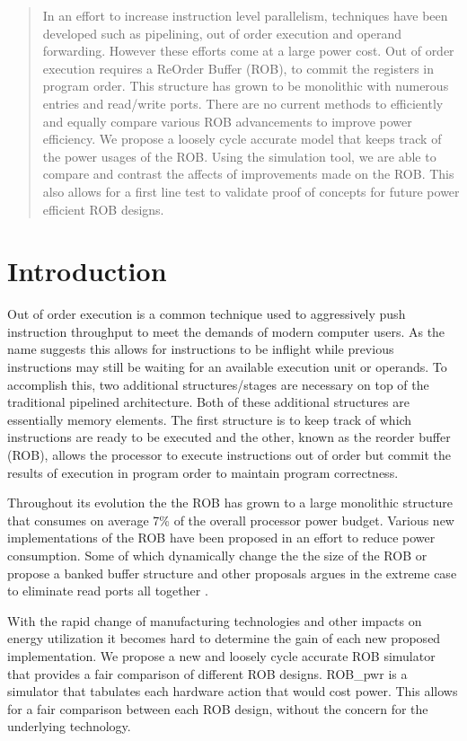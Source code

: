 \begin{abstract}
        In an effort to increase instruction level parallelism, techniques have been developed such
as pipelining, out of order execution and operand forwarding.  However
these efforts come at a large power cost.  Out of order execution requires
a ReOrder Buffer (ROB), to commit the registers in program order.  This
structure has grown to be monolithic with numerous entries and read/write ports.
There are no current methods to efficiently and equally compare various
ROB advancements to improve power efficiency. We propose a loosely cycle
accurate model that keeps track of the power usages of the ROB.  Using the 
simulation tool, we are able to compare and contrast the affects of improvements
made on the ROB.  This also allows for a first line test to validate proof of
concepts for future power efficient ROB designs.
\end{abstract}



\section{Introduction}
Out of order execution is a common technique used to aggressively push instruction
throughput to meet the demands of modern computer users.  As the name suggests
this allows for instructions to be inflight while previous instructions may still be waiting 
for an available execution unit or operands.  To accomplish this, two additional structures/stages
are necessary  on top of the traditional pipelined architecture.  Both of these additional
structures are essentially memory elements. The first structure is to keep track of which instructions
are ready to be executed and the other, known as the reorder buffer (ROB), allows the processor to 
execute instructions out of order but commit the results of execution in program order to maintain 
program correctness.  

Throughout its evolution the the ROB has grown to a large monolithic structure that consumes
on average 7\% of the overall processor power budget\cite{rabaey}.  Various new implementations
of the ROB have been proposed in an effort to reduce power consumption.  Some of which 
dynamically change the the size of the ROB or propose a banked buffer structure and other proposals argues in the 
extreme case to eliminate read ports all together\cite{kucuk}\cite{kucuk2} \cite{kucuk3}.

With the rapid change of manufacturing technologies and other impacts on energy utilization it 
becomes hard to determine the gain of each new proposed implementation.  We propose a new
and loosely cycle accurate ROB simulator that provides a fair comparison of  different ROB designs.
ROB\_pwr is a simulator that tabulates each hardware action that would cost power.  This allows for a fair
comparison between each ROB design, without the concern for the underlying technology. 

